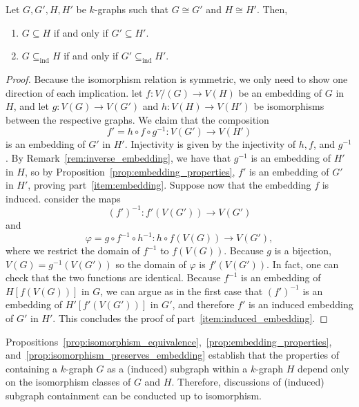 \begin{proposition} \label{prop:isomorphism_preserves_embedding}
    Let $G, G', H, H'$ be $k$-graphs such that $G \cong G'$ and $H \cong H'$.
    Then,
    \begin{enumerate}
        \item $G \subseteq H$ if and only if $G' \subseteq H'$. \label{item:embedding}
        \item $G \subseteq_{\text{ind}} H$ if and only if $G' \subseteq_{\text{ind}} H'$. \label{item:induced_embedding}
    \end{enumerate}
    \begin{proof} %
        Because the isomorphism relation is symmetric, we only need to show one direction of each implication.
        let $f: V/(G) \to V(H)$ be an embedding of $G$ in $H$, and let
        $g: V(G) \to V(G')$ and $h: V(H) \to V(H')$ be isomorphisms between the respective graphs.
        We claim that the composition
        \[f' = h \circ f \circ g^{-1}: V(G') \to V(H')\]
        is an embedding of $G'$ in $H'$.
        Injectivity is given by the injectivity of $h, f$, and $g^{-1}$.
        By Remark~\ref{rem:inverse_embedding}, we have that $g^{-1}$ is an embedding of $H'$ in $H$,
        so by Proposition~\ref{prop:embedding_properties},
        $f'$ is an embedding of $G'$ in $H'$, proving part~\eqref{item:embedding}.
        Suppose now that the embedding $f$ is induced.
        consider the maps
        \[
            (f')^{-1}: f'(V(G')) \to V(G')
        \]
        and
        \[
            \varphi = g \circ f^{-1} \circ h^{-1}: h \circ f(V(G)) \to V(G'),
        \]
        where we restrict the domain of $f^{-1}$ to $f(V(G))$.
        Because $g$ is a bijection, $V(G) = g^{-1}(V(G'))$ so the
        domain of $\varphi$ is $f'(V(G'))$.
        In fact, one can check that the two functions are identical.
        Because $f^{-1}$ is an embedding of $H[f(V(G))]$ in $G$,
        we can argue as in the first case that
        $(f')^{-1}$ is an embedding of $H'[f'(V(G'))]$ in $G'$,
        and therefore $f'$ is an induced embedding of $G'$ in $H'$.
        This concludes the proof of part~\eqref{item:induced_embedding}.
    \end{proof}
\end{proposition}

Propositions~\ref{prop:isomorphism_equivalence},~\ref{prop:embedding_properties},
and~\ref{prop:isomorphism_preserves_embedding}
establish that the properties of containing a $k$-graph $G$ as a (induced)
subgraph within a $k$-graph $H$ depend only on the isomorphism classes of $G$ and $H$.
Therefore, discussions of (induced) subgraph containment can be conducted up to isomorphism.

